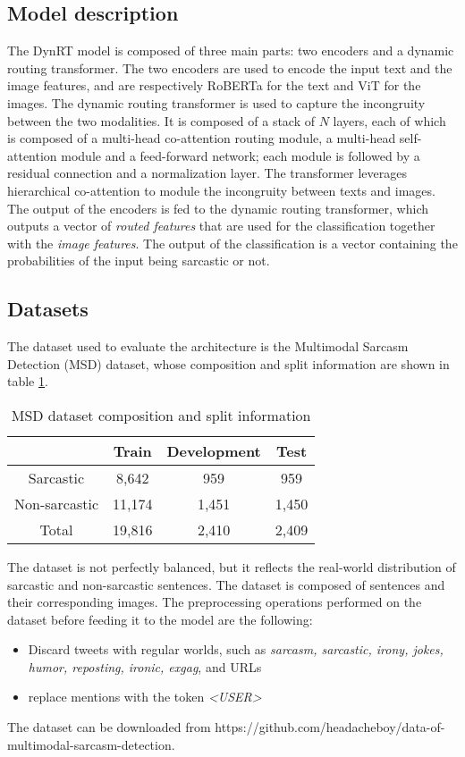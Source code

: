 \subsection{Model description}
The DynRT model is composed of three main parts: two encoders and a dynamic routing transformer. The two encoders are used to encode the input text and the image features, and are respectively RoBERTa \cite{RoBERTa} for the text and ViT \cite{ViT} for the images. The dynamic routing transformer is used to capture the incongruity between the two modalities. It is composed of a stack of $N$ layers, each of which is composed of a multi-head co-attention routing module, a multi-head self-attention module and a feed-forward network; each module is followed by a residual connection and a normalization layer. The transformer leverages hierarchical co-attention to module the incongruity between texts and images. The output of the encoders is fed to the dynamic routing transformer, which outputs a vector of \textit{routed features} that are used for the classification together with the \textit{image features}. The output of the classification is a vector containing the probabilities of the input being sarcastic or not. 

\subsection{Datasets}
The dataset used to evaluate the architecture is the Multimodal Sarcasm Detection (MSD) dataset, whose composition and split information are shown in table \ref{tab:MSD}.
\begin{table}
    \caption{MSD dataset composition and split information}
    \label{tab:MSD}
    \centering
    \begin{tabular}{|c c c c|}
        \hline
         & \textbf{Train} & \textbf{Development} & \textbf{Test} \\
        \hline
        Sarcastic & 8,642 & 959 & 959 \\
        Non-sarcastic & 11,174 & 1,451 & 1,450 \\
        Total & 19,816 & 2,410 & 2,409 \\
        \hline
    \end{tabular}
\end{table}
The dataset is not perfectly balanced, but it reflects the real-world distribution of sarcastic and non-sarcastic sentences. The dataset is composed of sentences and their corresponding images. The preprocessing operations performed on the dataset before feeding it to the model are the following:
\begin{itemize}
    \item Discard tweets with regular worlds, such as \textit{sarcasm, sarcastic, irony, jokes, humor, reposting, ironic, exgag}, and URLs
    \item replace mentions with the token \textit{<USER>}
\end{itemize}
The dataset can be downloaded from https://github.com/headacheboy/data-of-multimodal-sarcasm-detection.


